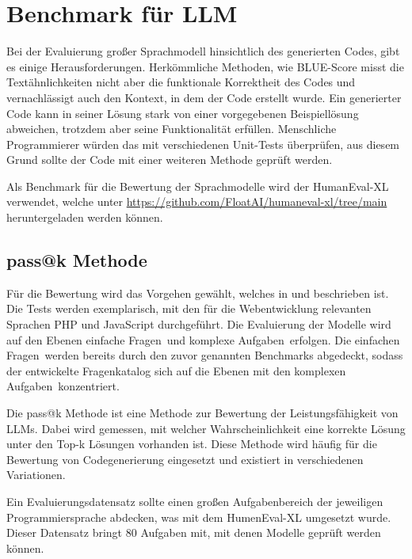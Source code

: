 

\section{Benchmark für LLM}
Bei der Evaluierung großer Sprachmodell hinsichtlich des generierten Codes, gibt es einige Herausforderungen. Herkömmliche Methoden, wie BLUE-Score misst die Textähnlichkeiten nicht aber die funktionale Korrektheit des Codes und vernachlässigt auch den Kontext, in dem der Code erstellt wurde. Ein generierter Code kann in seiner Lösung stark von einer vorgegebenen Beispiellösung abweichen, trotzdem aber seine Funktionalität erfüllen. Menschliche Programmierer würden das mit verschiedenen Unit-Tests überprüfen, aus diesem Grund sollte der Code mit einer weiteren Methode geprüft werden.\vspace{0.2cm}

Als Benchmark für die Bewertung der Sprachmodelle wird der HumanEval-XL verwendet, welche unter \href{https://github.com/FloatAI/humaneval-xl/tree/main}{https://github.com/FloatAI/humaneval-xl/tree/main} heruntergeladen werden können.

\subsection{pass@k Methode}
Für die Bewertung wird das Vorgehen gewählt, welches in \cite{chen-2021} und \cite{peng-2024} beschrieben ist. Die Tests werden exemplarisch, mit den für die Webentwicklung relevanten Sprachen PHP und JavaScript durchgeführt. Die Evaluierung der Modelle wird auf den Ebenen \glqq einfache Fragen\grqq \ und \glqq komplexe Aufgaben\grqq \ erfolgen. Die \glqq einfachen Fragen\grqq \ werden bereits durch den zuvor genannten Benchmarks abgedeckt, sodass der entwickelte Fragenkatalog sich auf die Ebenen mit den \glqq komplexen Aufgaben\grqq \ konzentriert.\vspace{0.2cm}

Die pass@k Methode ist eine Methode zur Bewertung der Leistungsfähigkeit von LLMs. Dabei wird gemessen, mit welcher Wahrscheinlichkeit eine korrekte Lösung unter den Top-k Lösungen vorhanden ist. Diese Methode wird häufig für die Bewertung von Codegenerierung eingesetzt und existiert in verschiedenen Variationen.\vspace{0.2cm}

Ein Evaluierungsdatensatz sollte einen großen Aufgabenbereich der jeweiligen Programmiersprache abdecken, was mit dem HumenEval-XL umgesetzt wurde. Dieser Datensatz bringt 80 Aufgaben mit, mit denen Modelle geprüft werden können.\vspace{0.2cm}

